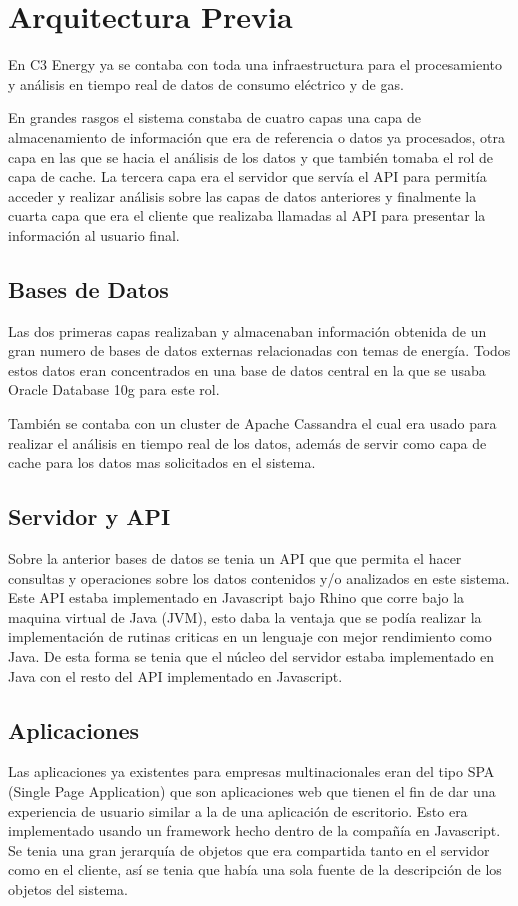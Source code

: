 \section{Arquitectura Previa}
En C3 Energy ya se contaba con toda una infraestructura para el
procesamiento y análisis en tiempo real de datos de consumo eléctrico
y de gas.

En grandes rasgos el sistema constaba de cuatro capas una capa de
almacenamiento de información que era de referencia o datos ya
procesados, otra capa en las que se hacia el análisis de los datos
y que también tomaba el rol de capa de cache. La tercera capa era el
servidor que servía el API para permitía acceder y realizar análisis
sobre las capas de datos anteriores y finalmente la cuarta capa que
era el cliente que realizaba llamadas al API para presentar la
información al usuario final.

\subsection{Bases de Datos}
Las dos primeras capas realizaban y almacenaban información obtenida
de un gran numero de bases de datos externas relacionadas con temas
de energía. Todos estos datos eran concentrados en una base de datos
central en la que se usaba Oracle Database 10g para este rol.

También se contaba con un cluster de Apache Cassandra el cual era usado
para realizar el análisis en tiempo real de los datos, además de servir
como capa de cache para los datos mas solicitados en el sistema.

\subsection{Servidor y API}
Sobre la anterior bases de datos se tenia un API que que permita el
hacer consultas y operaciones sobre los datos contenidos y/o analizados
en este sistema. Este API estaba implementado en Javascript bajo Rhino
que corre bajo la maquina virtual de Java (JVM), esto daba la ventaja
que se podía realizar la implementación de rutinas criticas en un
lenguaje con mejor rendimiento como Java. De esta forma se tenia que el
núcleo del servidor estaba implementado en Java con el resto del API
implementado en Javascript.

\subsection{Aplicaciones}
Las aplicaciones ya existentes para empresas multinacionales eran del tipo
SPA (Single Page Application) que son aplicaciones web que tienen el fin
de dar una experiencia de usuario similar a la de una aplicación de escritorio.
Esto era implementado usando un framework hecho dentro de la compañía
en Javascript. Se tenia una gran jerarquía de objetos que era
compartida tanto en el servidor como en el cliente, así se tenia que
había una sola fuente de la descripción de los objetos del sistema.

